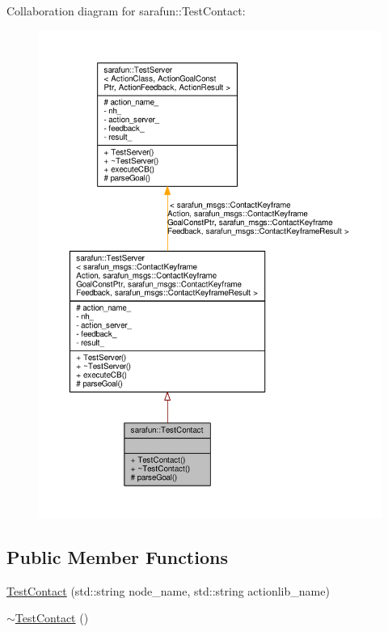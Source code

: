 Collaboration diagram for sarafun\-:\-:Test\-Contact\-:\nopagebreak
\begin{figure}[H]
\begin{center}
\leavevmode
\includegraphics[width=350pt]{dd/d1c/classsarafun_1_1TestContact__coll__graph}
\end{center}
\end{figure}
\subsection*{Public Member Functions}
\begin{DoxyCompactItemize}
\item 
\hyperlink{classsarafun_1_1TestContact_a0b2c1e94e50342e0433ea04919c31189_a0b2c1e94e50342e0433ea04919c31189}{Test\-Contact} (std\-::string node\-\_\-name, std\-::string actionlib\-\_\-name)
\item 
\hyperlink{classsarafun_1_1TestContact_a8b045e1f7984add10b7c024b6fde69ed_a8b045e1f7984add10b7c024b6fde69ed}{$\sim$\-Test\-Contact} ()
\end{DoxyCompactItemize}
